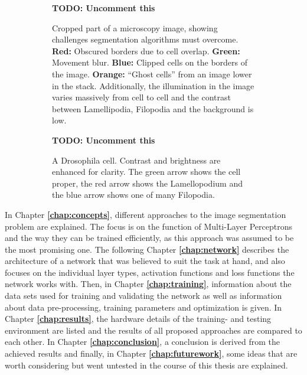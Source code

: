 \begin {figure}[!ht]	
	\centering
	\begin {subfigure}[t]{0.52\linewidth}
		\textbf{TODO: Uncomment this}

		\caption*{Cropped part of a microscopy image, showing challenges segmentation algorithms must overcome. \textbf{Red:} Obscured borders due to cell overlap. \textbf{Green:} Movement blur. \textbf{Blue:} Clipped cells on the borders of the image. \textbf{Orange:} ``Ghost cells'' from an image lower in the stack. Additionally, the illumination in the image varies massively from cell to cell and the contrast between Lamellipodia, Filopodia and the background is low.}
	\end {subfigure}
	\hspace{1cm}
	\begin {subfigure}[t]{0.35\linewidth}
		\textbf{TODO: Uncomment this}

		\caption*{A Drosophila cell. Contrast and brightness are enhanced for clarity. The green arrow shows the cell proper, the red arrow shows the Lamellopodium and the blue arrow shows one of many Filopodia.}
	\end {subfigure}

	\caption[]{}
	\label{fig:cell_example}
\end {figure}

\noindent In Chapter \textbf{\ref{chap:concepts}}, different approaches to the image segmentation problem are explained. The focus is on the function of Multi-Layer Perceptrons and the way they can be trained efficiently, as this approach was assumed to be the most promising one. The following Chapter \textbf{\ref{chap:network}} describes the architecture of a network that was believed to suit the task at hand, and also focuses on the individual layer types, activation functions and loss functions the network works with. Then, in Chapter \textbf{\ref{chap:training}}, information about the data sets used for training and validating the network as well as information about data pre-processing, training parameters and optimization is given. In Chapter \textbf{\ref{chap:results}}, the hardware details of the training- and testing environment are listed and the results of all proposed approaches are compared to each other. In Chapter \textbf{\ref{chap:conclusion}}, a conclusion is derived from the achieved results and finally, in Chapter \textbf{\ref{chap:futurework}}, some ideas that are worth considering but went untested in the course of this thesis are explained. 